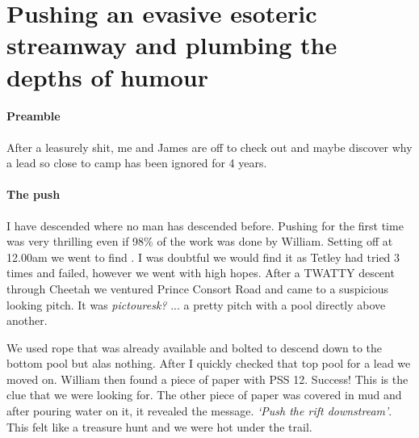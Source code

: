 

\section{Pushing an evasive esoteric streamway and plumbing the depths of humour}

\begin{marginfigure}
\end{marginfigure}

\paragraph{Preamble}
After a leasurely shit, me and James are off to check out  and maybe discover why a lead so close to camp has been ignored for 4 years.
\paragraph{The push} I have descended where no man has descended before. Pushing for the first time was very thrilling even if 98$\%$ of the work was done by William. 
Setting off at 12.00am we went to find . I was doubtful we would find it as Tetley had tried 3 times and failed, however we went with high hopes.
After a TWATTY descent through Cheetah we ventured Prince Consort Road and came to a suspicious looking pitch. It was \textit{pictouresk?} ...  a pretty pitch with a pool directly above another.

We used rope that was already available and bolted to descend down to the bottom pool but alas nothing. After I quickly checked that top pool for a lead we moved on. William then found a piece of paper with PSS 12. Success! This is the clue that we were looking for. The other piece of paper was covered in mud and after pouring water on it, it revealed the message.  \textit{‘Push the rift downstream’}. This felt like a treasure hunt and we were hot under the trail.

